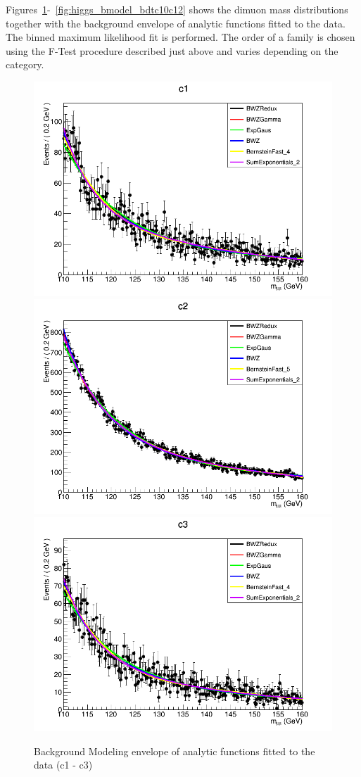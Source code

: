 Figures~\ref{fig:higgs_bmodel_bdtc1c3}-~\ref{fig:higgs_bmodel_bdtc10c12} shows the dimuon mass distributions together with the background envelope of analytic functions fitted to the data. The binned maximum likelihood fit is performed. The order of a family is chosen using the F-Test procedure described just above and varies depending on the category.
\begin{figure}[hbp]
  \centering
  \includegraphics[width=0.65\linewidth]{figures/ch_higgs/backgroundmodel/uf_bdt/backgroundFits__c1__bkgModels.png}\\
  \includegraphics[width=0.65\linewidth]{figures/ch_higgs/backgroundmodel/uf_bdt/backgroundFits__c2__bkgModels.png}\\
  \includegraphics[width=0.65\linewidth]{figures/ch_higgs/backgroundmodel/uf_bdt/backgroundFits__c3__bkgModels.png}
  \caption{Background Modeling envelope of analytic functions fitted to the data (c1 - c3)}
  \label{fig:higgs_bmodel_bdtc1c3}
\end{figure}
